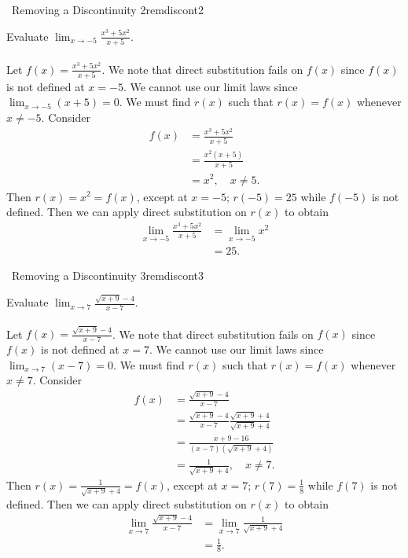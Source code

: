         \begin{example}{\Difficulty\,\Difficulty\,\,Removing a Discontinuity 2}{remdiscont2}

            Evaluate \(\lim_{x \to -5}\frac{x^3+5x^2}{x+5}\).
            \\
            \\
            Let \(f(x)=\frac{x^3+5x^2}{x+5}\). We note that direct substitution fails on \(f(x)\) since \(f(x)\) is not defined at \(x=-5\). We cannot use our limit laws since \(\lim_{x\to -5}(x+5)=0\). We must find \(r(x)\) such that \(r(x)=f(x)\) whenever \(x\neq -5\). Consider
            \begin{align*}
                f(x)&=\frac{x^3+5x^2}{x+5} \\
                &=\frac{x^2(x+5)}{x+5} \\
                &=x^2,\quad x\neq 5.
            \end{align*}
            Then \(r(x)=x^2=f(x)\), except at \(x=-5\); \(r(-5)=25\) while \(f(-5)\) is not defined. Then we can apply direct substitution on \(r(x)\) to obtain
            \begin{align*}
                \lim_{x \to -5}\frac{x^3+5x^2}{x+5}&=\lim_{x\to -5}x^2 \\
                &=25.
            \end{align*}
            
        \end{example}
        \begin{example}{\Difficulty\,\Difficulty\,\,Removing a Discontinuity 3}{remdiscont3}

            Evaluate \(\lim_{x \to 7}\frac{\sqrt{x+9}-4}{x-7}\).
            \\
            \\
            Let \(f(x)=\frac{\sqrt{x+9}-4}{x-7}\). We note that direct substitution fails on \(f(x)\) since \(f(x)\) is not defined at \(x=7\). We cannot use our limit laws since \(\lim_{x\to 7}(x-7)=0\). We must find \(r(x)\) such that \(r(x)=f(x)\) whenever \(x\neq 7\). Consider
            \begin{align*}
                f(x)&=\frac{\sqrt{x+9}-4}{x-7} \\
                &=\frac{\sqrt{x+9}-4}{x-7}\frac{\sqrt{x+9}+4}{\sqrt{x+9}+4} \\
                &=\frac{x+9-16}{(x-7)(\sqrt{x+9}+4)} \\
                &=\frac{1}{\sqrt{x+9}+4},\quad x\neq 7.
            \end{align*}
            Then \(r(x)=\frac{1}{\sqrt{x+9}+4}=f(x)\), except at \(x=7\); \(r(7)=\frac{1}{8}\) while \(f(7)\) is not defined. Then we can apply direct substitution on \(r(x)\) to obtain
            \begin{align*}
                \lim_{x \to 7}\frac{\sqrt{x+9}-4}{x-7}&=\lim_{x\to 7}\frac{1}{\sqrt{x+9}+4} \\
                &=\frac{1}{8}.
            \end{align*}
            
        \end{example}
